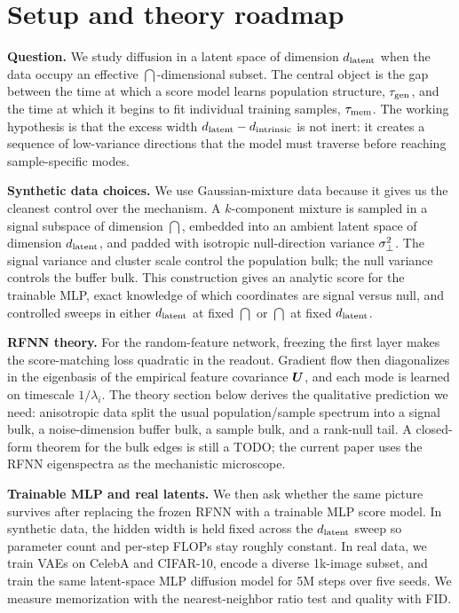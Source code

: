 \section{Setup and theory roadmap}
\label{sec:design}

\textbf{Question.}
We study diffusion in a latent space of dimension $d_{\mathrm{latent}}$ when the
data occupy an effective $\dint$-dimensional subset. The central
object is the gap between the time at which a score model learns
population structure, $\tau_{\mathrm{gen}}$, and the time at which it begins to
fit individual training samples, $\tau_{\mathrm{mem}}$. The working hypothesis
is that the excess width $d_{\mathrm{latent}}-d_{\mathrm{intrinsic}}$ is not inert: it creates a
sequence of low-variance directions that the model must traverse
before reaching sample-specific modes.

\textbf{Synthetic data choices.}
We use Gaussian-mixture data because it gives us the cleanest
control over the mechanism. A $k$-component mixture is sampled in a
signal subspace of dimension $\dint$, embedded into an ambient
latent space of dimension $d_{\mathrm{latent}}$, and padded with isotropic
null-direction variance $\sigma_{\perp}^2$. The signal variance and
cluster scale control the population bulk; the null variance
controls the buffer bulk. This construction gives an analytic score
for the trainable MLP, exact knowledge of which coordinates are
signal versus null, and controlled sweeps in either $d_{\mathrm{latent}}$ at
fixed $\dint$ or $\dint$ at fixed $d_{\mathrm{latent}}$.

\textbf{RFNN theory.}
For the random-feature network, freezing the first layer makes the
score-matching loss quadratic in the readout. Gradient flow then
diagonalizes in the eigenbasis of the empirical feature covariance
$\bm{U}$, and each mode is learned on timescale $1/\lambda_i$. The
theory section below derives the qualitative prediction we need:
anisotropic data split the usual population/sample spectrum into a
signal bulk, a noise-dimension buffer bulk, a sample bulk, and a
rank-null tail. A closed-form theorem for the bulk edges is still a
TODO; the current paper uses the RFNN eigenspectra as the
mechanistic microscope.

\textbf{Trainable MLP and real latents.}
We then ask whether the same picture survives after replacing the
frozen RFNN with a trainable MLP score model. In synthetic data, the
hidden width is held fixed across the $d_{\mathrm{latent}}$ sweep so parameter
count and per-step FLOPs stay roughly constant. In real data, we
train VAEs on CelebA and CIFAR-10, encode a diverse 1k-image subset,
and train the same latent-space MLP diffusion model for 5M steps
over five seeds. We measure memorization with the
\citet{somepalli2023diffusion} nearest-neighbor ratio test and
quality with FID.
